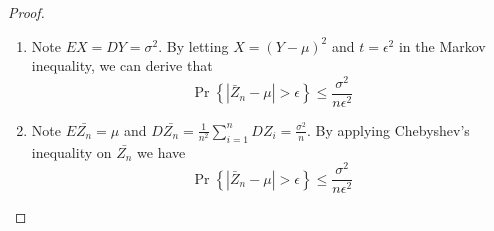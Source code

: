 \begin{exercise}
\begin{proof}
\begin{enumerate}
    \item {
      Note $EX = DY =\sigma^2$. By letting $X = (Y-\mu)^2$ and $t = \epsilon^2$ in the Markov inequality, we can derive that
    \begin{equation}\operatorname{Pr}\left\{\left|\bar{Z}_{n}-\mu\right|>\epsilon\right\} \leq \frac{\sigma^{2}}{n \epsilon^{2}}\end{equation}
    }
    \item {
      Note $E\bar{Z_n} = \mu$ and $D\bar{Z_n} = \frac{1}{n^2} \sum_{i=1}^n DZ_i = \frac{\sigma^2}{n}$. By applying Chebyshev's inequality on $\bar{Z_n}$ we have
    \begin{equation}\operatorname{Pr}\left\{\left|\bar{Z}_{n}-\mu\right|>\epsilon\right\} \leq \frac{\sigma^{2}}{n \epsilon^{2}}\end{equation}
    }
  \end{enumerate}
  \end{proof}
  \label{ex5}
\end{exercise}

